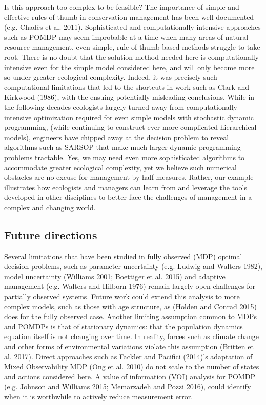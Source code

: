 \documentclass[3p]{elsarticle} %
\begin{document}
Is this approach too complex to be feasible? The importance of simple
and effective rules of thumb in conservation management has been well
documented (e.g. Chadès et al. 2011). Sophisticated and computationally
intensive approaches such as POMDP may seem improbable at a time when
many areas of natural resource management, even simple, rule-of-thumb
based methods struggle to take root. There is no doubt that the solution
method needed here is computationally intensive even for the simple
model considered here, and will only become more so under greater
ecological complexity. Indeed, it was precisely such computational
limitations that led to the shortcuts in work such as Clark and Kirkwood
(1986), with the ensuing potentially misleading conclusions. While in
the following decades ecologists largely turned away from
computationally intensive optimization required for even simple models
with stochastic dynamic programming, (while continuing to construct ever
more complicated hierarchical models), engineers have chipped away at
the decision problem to reveal algorithms such as SARSOP that make much
larger dynamic programming problems tractable. Yes, we may need even
more sophisticated algorithms to accommodate greater ecological
complexity, yet we believe such numerical obstacles are no excuse for
management by half measures. Rather, our example illustrates how
ecologists and managers can learn from and leverage the tools developed
in other disciplines to better face the challenges of management in a
complex and changing world.

\hypertarget{future-directions}{%
\subsection{Future directions}\label{future-directions}}

Several limitations that have been studied in fully observed (MDP)
optimal decision problems, such as parameter uncertainty (e.g. Ludwig
and Walters 1982), model uncertainty (Williams 2001; Boettiger et al.
2015) and adaptive management (e.g. Walters and Hilborn 1976) remain
largely open challenges for partially observed systems. Future work
could extend this analysis to more complex models, such as those with
age structure, as (Holden and Conrad 2015) does for the fully observed
case. Another limiting assumption common to MDPs and POMDPs is that of
stationary dynamics: that the population dynamics equation itself is not
changing over time. In reality, forces such as climate change and other
forms of environmental variations violate this assumption (Britten et
al. 2017). Direct approaches such as Fackler and Pacifici (2014)'s
adaptation of Mixed Observability MDP (Ong et al. 2010) do not scale to
the number of states and actions considered here. A value of information
(VOI) analysis for POMDP (e.g. Johnson and Williams 2015; Memarzadeh and
Pozzi 2016), could identify when it is worthwhile to actively reduce
measurement error.
\end{document}
